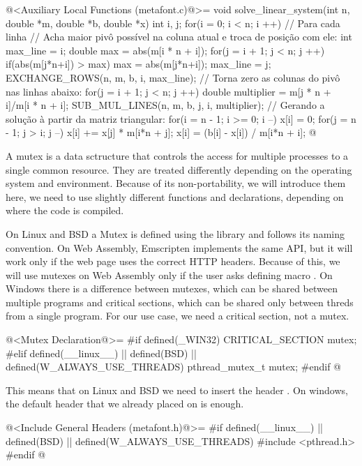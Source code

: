 \iniciocodigo
@<Auxiliary Local Functions (metafont.c)@>=
void solve_linear_system(int n, double *m, double *b, double *x){
  int i, j;
  for(i = 0; i < n; i ++){ // Para cada linha
    // Acha maior pivô possível na coluna atual e troca de posição com ele:
    int max_line = i;
    double max = abs(m[i * n + i]);
    for(j = i + 1; j < n; j ++){
      if(abs(m[j*n+i]) > max){
        max = abs(m[j*n+i]);
        max_line = j;
      }
    }
    EXCHANGE_ROWS(n, m, b, i, max_line);
    // Torna zero as colunas do pivô nas linhas abaixo:
    for(j = i + 1; j < n; j ++){
      double multiplier = m[j * n + i]/m[i * n + i];
      SUB_MUL_LINES(n, m, b, j, i, multiplier);
    }
  }
  // Gerando a solução à partir da matriz triangular:
  for(i = n - 1; i >= 0; i --){
    x[i] = 0;
    for(j = n - 1; j > i; j --)
      x[i] += x[j] * m[i*n + j];
    x[i] = (b[i] - x[i]) / m[i*n + i];
  }
}
@
\fimcodigo



A mutex is a data sctructure that controls the access for multiple
processes to a single common resource. They are treated differently
depending on the operating system and environment. Because of its
non-portability, we will introduce them here, we need to use slightly
different functions and declarations, depending on where the code is
compiled.

On Linux and BSD a Mutex is defined using the library
 and follows its naming convention. On Web Assembly,
Emscripten implements the same API, but it will work only if the web
page uses the correct HTTP headers. Because of this, we will use
mutexes on Web Assembly only if the user asks defining macro
. On Windows there is a difference
between mutexes, which can be shared between multiple programs and
critical sections, which can be shared only between threds from a
single program. For our use case, we need a critical section, not a
mutex.

\iniciocodigo
@<Mutex Declaration@>=
#if defined(_WIN32)
CRITICAL_SECTION mutex;
#elif defined(__linux__) || defined(BSD) || defined(W_ALWAYS_USE_THREADS)
pthread_mutex_t mutex;
#endif
@
\fimcodigo

This means that on Linux and BSD we need to insert the
header . On windows, the default header that we
already placed on  is enough.

\iniciocodigo
@<Include General Headers (metafont.h)@>=
#if defined(__linux__) || defined(BSD) || defined(W_ALWAYS_USE_THREADS)
#include <pthread.h>
#endif
@
\fimcodigo

